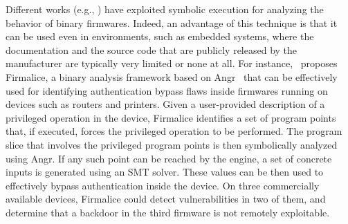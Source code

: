 Different works (e.g., \cite{DMR-USEC13,ZBF-NDSS14,FIRMALICE-NDSS15}) have exploited symbolic execution for analyzing the behavior of binary firmwares. Indeed, an advantage of this technique is that it can be used even in environments, such as embedded systems, where the documentation and the source code that are publicly released by the manufacturer are typically very limited or none at all. For instance,~\cite{FIRMALICE-NDSS15} proposes Firmalice, a binary analysis framework based on {\sc Angr}~\cite{ANGR-SSP16} that can be effectively used for identifying authentication bypass flaws inside firmwares running on devices such as routers and printers. Given a user-provided description of a privileged operation in the device, Firmalice identifies a set of program points that, if executed, forces the privileged operation to be performed. The program slice that involves the privileged program points is then symbolically analyzed using {\sc Angr}. If any such point can be reached by the engine, a set of concrete inputs is generated using an SMT solver. These values can be then used to effectively bypass authentication inside the device. On three commercially available devices, Firmalice could detect vulnerabilities in two of them, and determine that a backdoor in the third firmware is not remotely exploitable.